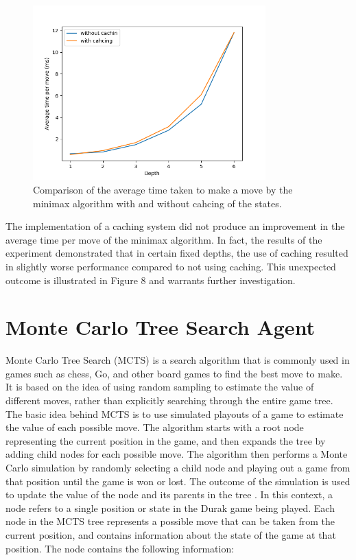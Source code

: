 \begin{figure}[h]
  \centering
  \captionsetup{justification=centering}
  \includegraphics[width=0.8\textwidth]{../img/caching.png}
  \caption{Comparison of the average time taken to make a move by the minimax algorithm with and without cahcing of the states.}
  \label{WithWithoutAlphaBeta}
\end{figure}

The implementation of a caching system did not produce an improvement in the average time per move of the minimax algorithm. In fact, the results of the experiment demonstrated that in certain fixed depths, the use of caching resulted in slightly worse performance compared to not using caching. This unexpected outcome is illustrated in Figure 8 and warrants further investigation.

\section{Monte Carlo Tree Search Agent}
\label{MCTS}

Monte Carlo Tree Search (MCTS) is a search algorithm that is commonly used in games such as chess, Go, and other board games to find the best move to make. It is based on the idea of using random sampling to estimate the value of different moves, rather than explicitly searching through the entire game tree. The basic idea behind MCTS is to use simulated playouts of a game to estimate the value of each possible move. The algorithm starts with a root node representing the current position in the game, and then expands the tree by adding child nodes for each possible move. The algorithm then performs a Monte Carlo simulation by randomly selecting a child node and playing out a game from that position until the game is won or lost. The outcome of the simulation is used to update the value of the node and its parents in the tree \citep{MCTSSurvey}. In this context, a node refers to a single position or state in the Durak game being played. Each node in the MCTS tree represents a possible move that can be taken from the current position, and contains information about the state of the game at that position. The node contains the following information: 

